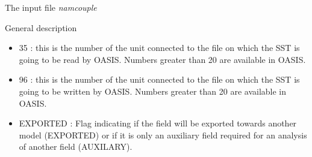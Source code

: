 \begin{subsection}{The input file {\it namcouple}}
\begin{subsubsection}{General description}
\begin{itemize}
            be the same as the file name used in the atmosphere model 
            to read the SST field. Note that there can be an arbitrary
            number of other fields also written in this output file. 
      \item 35 : this is the number of the unit connected to the file on
            which the SST is going to be read by OASIS. Numbers
            greater than 20 are available in OASIS.
      \item 96 : this is the number of the unit connected to the file on
            which the SST is going to be written by OASIS. Numbers
            greater than 20 are available in OASIS.
      \item EXPORTED : Flag indicating if the field will be exported 
            towards another model (EXPORTED) or if it is only an 
            auxiliary field required for an analysis of another field
            (AUXILARY).
    \end{itemize}


\vspace{0.4cm}


\end{subsubsection}
\end{subsection}
